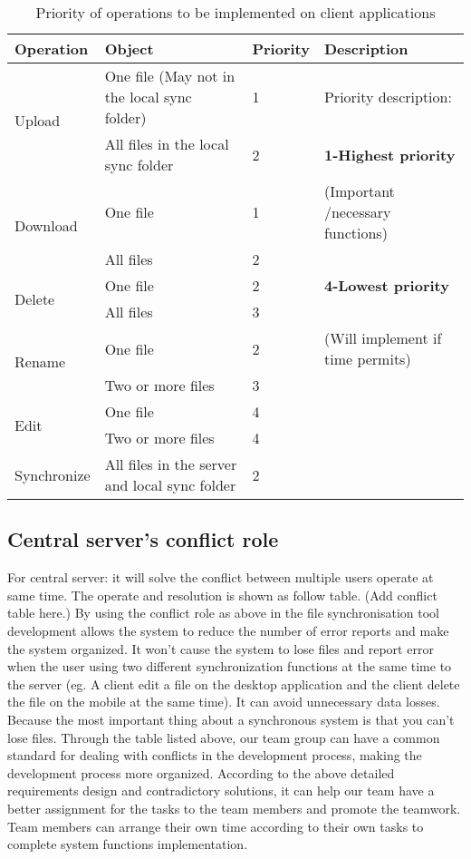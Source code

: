 \bgroup
\def\arraystretch{1.2}
\begin{table}[H]
\centering
\begin{tabular}{|m{2cm}|m{2cm}|m{1.5cm}|m{2.5cm}|}
\hline
Operation & Object & Priority & Description \\
\hline
\multirow{2}{*}{Upload}&{One file (May not in the local sync folder)}&1&{Priority description:}\\
\cline{2-3}
&All files in the local sync folder&2&{\textbf{1-Highest priority}}\\
\cline{1-3}
\multirow{2}{*}{Download}&{One file}&1&{(Important /necessary functions)}\\
\cline{2-3}
&All files&2&{}\\
\cline{1-3}
\multirow{2}{*}{Delete}&{One file}&2&{\textbf{4-Lowest priority}}\\
\cline{2-3}
&All files&3&{}\\
\cline{1-3}
\multirow{2}{*}{Rename}&{One file}&2&{(Will implement if time permits)}\\
\cline{2-3}
&Two or more files&3&{}\\
\cline{1-3}
\multirow{2}{*}{Edit}&{One file}&4&{}\\
\cline{2-3}
&Two or more files&4&{}\\
\cline{1-3}
\multirow{1}{*}{Synchronize}&{All files in the server and local sync folder}&2&{}\\
\cline{1-4}
\bottomrule
\end{tabular}
\caption{Priority of operations to be implemented on client applications}
\end{table}
\egroup


\subsection{Central server’s conflict role}
For central server: it will solve the conflict between multiple users operate at same time. The operate and resolution is shown as follow table.\newline
(Add conflict table here.)\newline
By using the conflict role as above in the file synchronisation tool development allows the system to reduce the number of error reports and make the system organized. It won't cause the system to lose files and report error when the user using two different synchronization functions at the same time to the server (eg. A client edit a file on the desktop application and the client delete the file on the mobile at the same time). It can avoid unnecessary data losses. Because the most important thing about a synchronous system is that you can't lose files. Through the table listed above, our team group can have a common standard for dealing with conflicts in the development process, making the development process more organized.\newline
According to the above detailed requirements design and contradictory solutions, it can help our team have a better assignment for the tasks to the team members and promote the teamwork. Team members can arrange their own time according to their own tasks to complete system functions implementation.\newline

